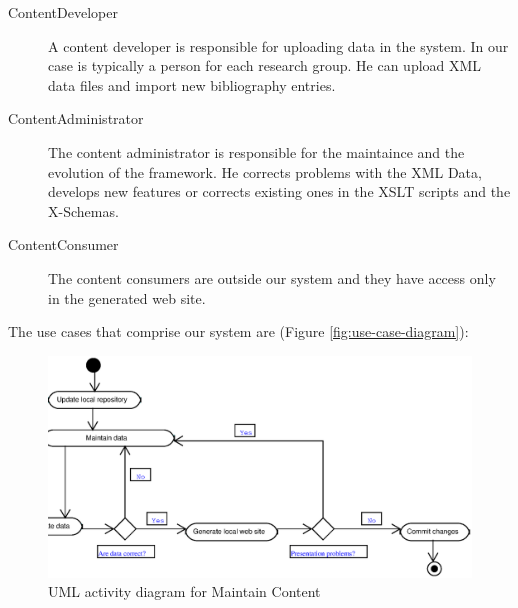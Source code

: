 \documentclass[10pt]{article}
\begin{document}
\begin{description}
\item[ContentDeveloper] A content developer is responsible for uploading data in the system. 
In our case is typically a person for each research group. He can upload XML data files and import new bibliography entries.

\item[ContentAdministrator] The content administrator is responsible for the maintaince 
and the evolution of the framework. He corrects problems with the XML Data, develops 
new features or corrects existing ones in the XSLT scripts and the X-Schemas.

\item[ContentConsumer] The content consumers are outside our system
and they have access only in the generated web site.
\end{description}

The use cases that comprise our system are (Figure \ref{fig:use-case-diagram}):

\begin{figure}
\includegraphics[scale=0.5]{maintain-content-activity}
\caption{UML activity diagram for Maintain Content}
\label{fig:maintain-content-diagram}
\end{figure}
\end{document}
